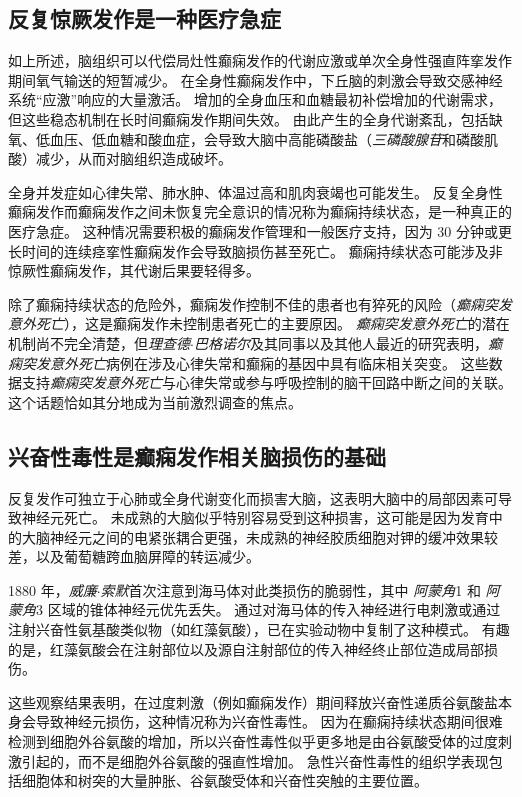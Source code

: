 \subsection{反复惊厥发作是一种医疗急症}

如上所述，脑组织可以代偿局灶性癫痫发作的代谢应激或单次全身性强直阵挛发作期间氧气输送的短暂减少。
在全身性癫痫发作中，下丘脑的刺激会导致交感神经系统“应激”响应的大量激活。
增加的全身血压和血糖最初补偿增加的代谢需求，但这些稳态机制在长时间癫痫发作期间失效。
由此产生的全身代谢紊乱，包括缺氧、低血压、低血糖和酸血症，会导致大脑中高能磷酸盐（\textit{三磷酸腺苷}和磷酸肌酸）减少，从而对脑组织造成破坏。


全身并发症如心律失常、肺水肿、体温过高和肌肉衰竭也可能发生。
反复全身性癫痫发作而癫痫发作之间未恢复完全意识的情况称为癫痫持续状态，是一种真正的医疗急症。
这种情况需要积极的癫痫发作管理和一般医疗支持，因为 30 分钟或更长时间的连续痉挛性癫痫发作会导致脑损伤甚至死亡。
癫痫持续状态可能涉及非惊厥性癫痫发作，其代谢后果要轻得多。


除了癫痫持续状态的危险外，癫痫发作控制不佳的患者也有猝死的风险（\textit{癫痫突发意外死亡}），这是癫痫发作未控制患者死亡的主要原因。
\textit{癫痫突发意外死亡}的潜在机制尚不完全清楚，但\textit{理查德$\cdot$巴格诺尔}及其同事以及其他人最近的研究表明，\textit{癫痫突发意外死亡}病例在涉及心律失常和癫痫的基因中具有临床相关突变。
这些数据支持\textit{癫痫突发意外死亡}与心律失常或参与呼吸控制的脑干回路中断之间的关联。
这个话题恰如其分地成为当前激烈调查的焦点。



\subsection{兴奋性毒性是癫痫发作相关脑损伤的基础}

反复发作可独立于心肺或全身代谢变化而损害大脑，这表明大脑中的局部因素可导致神经元死亡。
未成熟的大脑似乎特别容易受到这种损害，这可能是因为发育中的大脑神经元之间的电紧张耦合更强，未成熟的神经胶质细胞对钾的缓冲效果较差，以及葡萄糖跨血脑屏障的转运减少。


1880 年，\textit{威廉$\cdot$索默}首次注意到海马体对此类损伤的脆弱性，其中 \textit{阿蒙角}1 和 \textit{阿蒙角}3 区域的锥体神经元优先丢失。
通过对海马体的传入神经进行电刺激或通过注射兴奋性氨基酸类似物（如红藻氨酸），已在实验动物中复制了这种模式。
有趣的是，红藻氨酸会在注射部位以及源自注射部位的传入神经终止部位造成局部损伤。


这些观察结果表明，在过度刺激（例如癫痫发作）期间释放兴奋性递质谷氨酸盐本身会导致神经元损伤，这种情况称为兴奋性毒性。
因为在癫痫持续状态期间很难检测到细胞外谷氨酸的增加，所以兴奋性毒性似乎更多地是由谷氨酸受体的过度刺激引起的，而不是细胞外谷氨酸的强直性增加。
急性兴奋性毒性的组织学表现包括细胞体和树突的大量肿胀、谷氨酸受体和兴奋性突触的主要位置。


